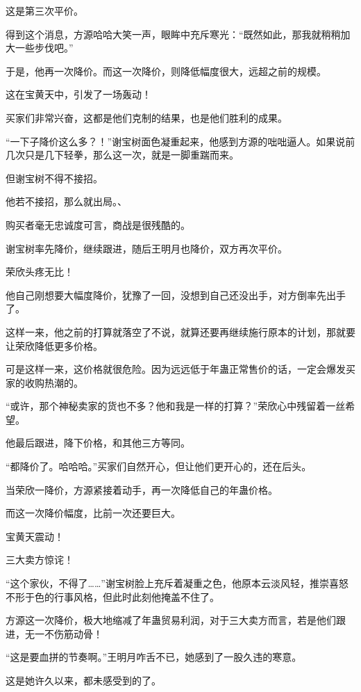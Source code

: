 \begin{this_body}
这是第三次平价。

得到这个消息，方源哈哈大笑一声，眼眸中充斥寒光：“既然如此，那我就稍稍加大一些步伐吧。”

于是，他再一次降价。而这一次降价，则降低幅度很大，远超之前的规模。

这在宝黄天中，引发了一场轰动！

买家们非常兴奋，这都是他们克制的结果，也是他们胜利的成果。

“一下子降价这么多？！”谢宝树面色凝重起来，他感到方源的咄咄逼人。如果说前几次只是几下轻拳，那么这一次，就是一脚重踹而来。

但谢宝树不得不接招。

他若不接招，那么就出局。、

购买者毫无忠诚度可言，商战是很残酷的。

谢宝树率先降价，继续跟进，随后王明月也降价，双方再次平价。

荣欣头疼无比！

他自己刚想要大幅度降价，犹豫了一回，没想到自己还没出手，对方倒率先出手了。

这样一来，他之前的打算就落空了不说，就算还要再继续施行原本的计划，那就要让荣欣降低更多价格。

可是这样一来，这价格就很危险。因为远远低于年蛊正常售价的话，一定会爆发买家的收购热潮的。

“或许，那个神秘卖家的货也不多？他和我是一样的打算？”荣欣心中残留着一丝希望。

他最后跟进，降下价格，和其他三方等同。

“都降价了。哈哈哈。”买家们自然开心，但让他们更开心的，还在后头。

当荣欣一降价，方源紧接着动手，再一次降低自己的年蛊价格。

而这一次降价幅度，比前一次还要巨大。

宝黄天震动！

三大卖方惊诧！

“这个家伙，不得了……”谢宝树脸上充斥着凝重之色，他原本云淡风轻，推崇喜怒不形于色的行事风格，但此时此刻他掩盖不住了。

方源这一次降价，极大地缩减了年蛊贸易利润，对于三大卖方而言，若是他们跟进，无一不伤筋动骨！

“这是要血拼的节奏啊。”王明月咋舌不已，她感到了一股久违的寒意。

这是她许久以来，都未感受到的了。

\end{this_body}

